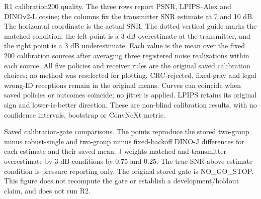R1 calibration200 quality. The three rows report PSNR, LPIPS–Alex and DINOv2-L cosine; the columns fix the transmitter SNR estimate at 7 and 10 dB. The horizontal coordinate is the actual SNR. The dotted vertical guide marks the matched condition; the left point is a 3 dB overestimate at the transmitter, and the right point is a 3 dB underestimate. Each value is the mean over the fixed 200 calibration sources after averaging three registered noise realizations within each source. All five policies and receiver rules are the original saved calibration choices; no method was reselected for plotting. CRC-rejected, fixed-gray and legal wrong-ID receptions remain in the original means. Curves can coincide when saved policies or outcomes coincide; no jitter is applied. LPIPS retains its original sign and lower-is-better direction. These are non-blind calibration results, with no confidence intervals, bootstrap or ConvNeXt metric.

Saved calibration-gate comparisons. The points reproduce the stored two-group minus robust-single and two-group minus fixed-backoff DINO-J differences for each estimate and their saved mean. J weights matched and transmitter-overestimate-by-3-dB conditions by 0.75 and 0.25. The true-SNR-above-estimate condition is pressure reporting only. The original stored gate is NO\_GO\_STOP. This figure does not recompute the gate or establish a development/holdout claim, and does not run R2.
